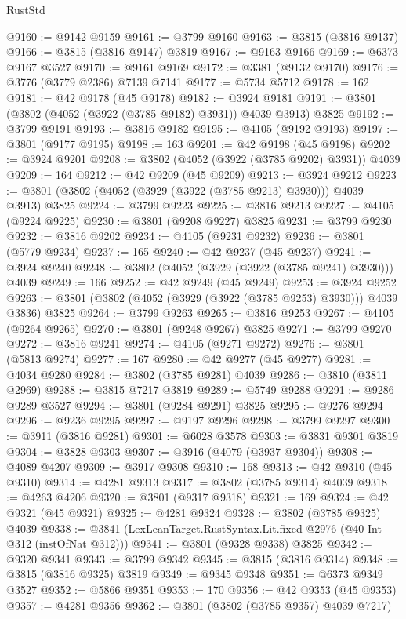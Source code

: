 \begin{lexlean}{RustStd}
\begin{coremodule}
@9160 := @9142 @9159
@9161 := @3799 @9160
@9163 := @3815 (@3816 @9137)
@9166 := @3815 (@3816 @9147) @3819
@9167 := @9163 @9166
@9169 := @6373 @9167 @3527
@9170 := @9161 @9169
@9172 := @3381 (@9132 @9170)
@9176 := @3776 (@3779 @2386) @7139 @7141
@9177 := @5734 @5712
@9178 := 162
@9181 := @42 @9178 (@45 @9178)
@9182 := @3924 @9181
@9191 := @3801 (@3802 (@4052 (@3922 (@3785 @9182) @3931)) @4039 @3913) @3825
@9192 := @3799 @9191
@9193 := @3816 @9182
@9195 := @4105 (@9192 @9193)
@9197 := @3801 (@9177 @9195)
@9198 := 163
@9201 := @42 @9198 (@45 @9198)
@9202 := @3924 @9201
@9208 := @3802 (@4052 (@3922 (@3785 @9202) @3931)) @4039
@9209 := 164
@9212 := @42 @9209 (@45 @9209)
@9213 := @3924 @9212
@9223 := @3801 (@3802 (@4052 (@3929 (@3922 (@3785 @9213) @3930))) @4039 @3913) @3825
@9224 := @3799 @9223
@9225 := @3816 @9213
@9227 := @4105 (@9224 @9225)
@9230 := @3801 (@9208 @9227) @3825
@9231 := @3799 @9230
@9232 := @3816 @9202
@9234 := @4105 (@9231 @9232)
@9236 := @3801 (@5779 @9234)
@9237 := 165
@9240 := @42 @9237 (@45 @9237)
@9241 := @3924 @9240
@9248 := @3802 (@4052 (@3929 (@3922 (@3785 @9241) @3930))) @4039
@9249 := 166
@9252 := @42 @9249 (@45 @9249)
@9253 := @3924 @9252
@9263 := @3801 (@3802 (@4052 (@3929 (@3922 (@3785 @9253) @3930))) @4039 @3836) @3825
@9264 := @3799 @9263
@9265 := @3816 @9253
@9267 := @4105 (@9264 @9265)
@9270 := @3801 (@9248 @9267) @3825
@9271 := @3799 @9270
@9272 := @3816 @9241
@9274 := @4105 (@9271 @9272)
@9276 := @3801 (@5813 @9274)
@9277 := 167
@9280 := @42 @9277 (@45 @9277)
@9281 := @4034 @9280
@9284 := @3802 (@3785 @9281) @4039
@9286 := @3810 (@3811 @2969)
@9288 := @3815 @7217 @3819
@9289 := @5749 @9288
@9291 := @9286 @9289 @3527
@9294 := @3801 (@9284 @9291) @3825
@9295 := @9276 @9294
@9296 := @9236 @9295
@9297 := @9197 @9296
@9298 := @3799 @9297
@9300 := @3911 (@3816 @9281)
@9301 := @6028 @3578
@9303 := @3831 @9301 @3819
@9304 := @3828 @9303
@9307 := @3916 (@4079 (@3937 @9304))
@9308 := @4089 @4207
@9309 := @3917 @9308
@9310 := 168
@9313 := @42 @9310 (@45 @9310)
@9314 := @4281 @9313
@9317 := @3802 (@3785 @9314) @4039
@9318 := @4263 @4206
@9320 := @3801 (@9317 @9318)
@9321 := 169
@9324 := @42 @9321 (@45 @9321)
@9325 := @4281 @9324
@9328 := @3802 (@3785 @9325) @4039
@9338 := @3841 (LexLeanTarget.RustSyntax.Lit.fixed @2976 (@40 Int @312 (instOfNat @312)))
@9341 := @3801 (@9328 @9338) @3825
@9342 := @9320 @9341
@9343 := @3799 @9342
@9345 := @3815 (@3816 @9314)
@9348 := @3815 (@3816 @9325) @3819
@9349 := @9345 @9348
@9351 := @6373 @9349 @3527
@9352 := @5866 @9351
@9353 := 170
@9356 := @42 @9353 (@45 @9353)
@9357 := @4281 @9356
@9362 := @3801 (@3802 (@3785 @9357) @4039 @7217)

\end{coremodule}
\end{lexlean}

